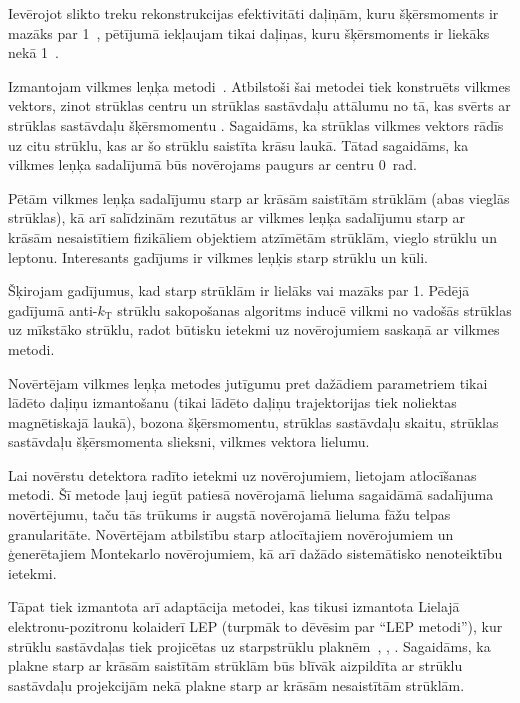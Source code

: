 Ievērojot slikto treku rekonstrukcijas efektivitāti daļiņām, kuru šķērsmoments ir mazāks par 1~\GeV, pētījumā iekļaujam tikai daļiņas, kuru šķērsmoments ir liekāks nekā 1~\GeV.
 
{}

Izmantojam vilkmes leņķa metodi~\cite{Gallicchio:2010sw}. Atbilstoši šai metodei tiek konstruēts vilkmes vektors, zinot strūklas centru un strūklas sastāvdaļu attālumu no tā, kas svērts ar strūklas sastāvdaļu šķērsmomentu \pt. Sagaidāms, ka strūklas vilkmes vektors rādīs uz citu strūklu, kas ar šo strūklu saistīta krāsu laukā. Tātad sagaidāms, ka vilkmes leņķa sadalījumā būs novērojams paugurs ar centru 0~rad.

Pētām vilkmes leņķa sadalījumu starp ar krāsām saistītām strūklām (abas vieglās strūklas), kā arī salīdzinām rezutātus ar vilkmes leņķa sadalījumu starp ar krāsām nesaistītiem fizikāliem objektiem \textendash \cPqb atzīmētām strūklām, vieglo strūklu un leptonu. Interesants gadījums ir vilkmes leņķis starp strūklu un kūli.

Šķirojam gadījumus, kad \DeltaR starp strūklām ir lielāks vai mazāks par 1. Pēdējā gadījumā anti-$k_{\text{T}}$ strūklu sakopošanas algoritms inducē vilkmi no vadošās strūklas uz mīkstāko strūklu, radot būtisku ietekmi uz novērojumiem saskaņā ar vilkmes metodi.

Novērtējam vilkmes leņķa metodes jutīgumu pret dažādiem parametriem \textendash tikai lādēto daļiņu izmantošanu (tikai lādēto daļiņu trajektorijas tiek noliektas magnētiskajā laukā), \PW bozona šķērsmomentu, strūklas sastāvdaļu skaitu, strūklas sastāvdaļu šķērsmomenta slieksni, vilkmes vektora lielumu.

Lai novērstu detektora radīto ietekmi uz novērojumiem, lietojam atlocīšanas metodi. Šī metode ļauj iegūt patiesā novērojamā lieluma sagaidāmā sadalījuma novērtējumu, taču tās trūkums ir augstā novērojamā lieluma fāžu telpas granularitāte. Novērtējam atbilstību starp atlocītajiem novērojumiem un ģenerētajiem Montekarlo novērojumiem, kā arī dažādo sistemātisko nenoteiktību ietekmi.  

Tāpat tiek izmantota arī adaptācija metodei, kas tikusi izmantota Lielajā elektronu-pozitronu kolaiderī LEP (turpmāk to dēvēsim par ``LEP metodi''), kur strūklu sastāvdaļas tiek projicētas uz starpstrūklu plaknēm~\cite{Abbiendi:2005es}, \cite{Abdallah:2006uq}, \cite{Achard:2003pe}. Sagaidāms, ka plakne starp ar krāsām saistītām strūklām būs blīvāk aizpildīta ar strūklu sastāvdaļu projekcijām nekā plakne starp ar krāsām nesaistītām strūklām.  

